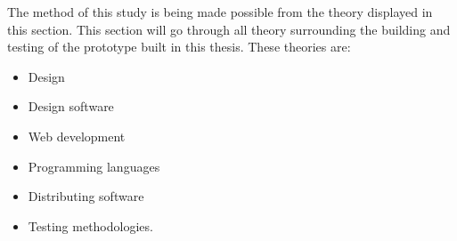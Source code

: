 The method of this study is being made possible from the theory displayed in this section. This section will go through all theory surrounding the building and testing of the prototype built in this thesis. These theories are: 
\begin{itemize}
  \item Design
  \item Design software
  \item Web development
  \item Programming languages
  \item Distributing software
  \item Testing methodologies. 
\end{itemize}
